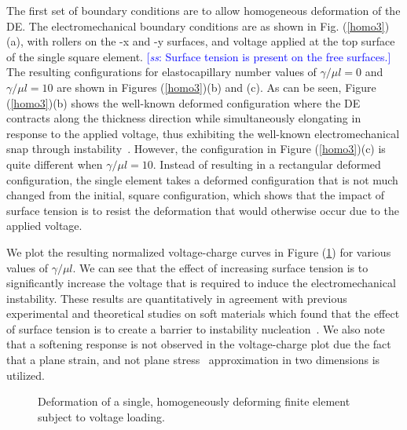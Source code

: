 \documentclass[final,authoryear,3p,times]{elsarticle}
\newcommand{\hsp}[1]{\textcolor{blue}{[\textit{ss}: #1]}}
\begin{document}
The first set of boundary conditions are to allow homogeneous deformation of the DE. The electromechanical boundary conditions are as shown in Fig. (\ref{homo3})(a), with rollers on the -x and -y surfaces, and voltage applied at the top surface of the single square element.  \hsp{Surface tension is present on the free surfaces.}  The resulting configurations for elastocapillary number values of $\gamma/\mu l=0$ and $\gamma/\mu l=10$ are shown in Figures (\ref{homo3})(b) and (c).  As can be seen, Figure (\ref{homo3})(b) shows the well-known deformed configuration where the DE contracts along the thickness direction while simultaneously elongating in response to the applied voltage, thus exhibiting the well-known electromechanical snap through instability~\cite{parkIJSS2012}.  However, the configuration in Figure (\ref{homo3})(c) is quite different when $\gamma/\mu l=10$.  Instead of resulting in a rectangular deformed configuration, the single element takes a deformed configuration that is not much changed from the initial, square configuration, which shows that the impact of surface tension is to resist the deformation that would otherwise occur due to the applied voltage.

We plot the resulting normalized voltage-charge curves in Figure (\ref{homo}) for various values of $\gamma/\mu l$.  We can see that the effect of increasing surface tension is to significantly increase the voltage that is required to induce the electromechanical instability.  These results are quantitatively in agreement with previous experimental and theoretical studies on soft materials which found that the effect of surface tension is to create a barrier to instability nucleation~\citep{chenPRL2012,moraSM2011}.  We also note that a softening response is not observed in the voltage-charge plot due the fact that a plane strain, and not plane stress~\citep{zhouIJSS2008} approximation in two dimensions is utilized. 

\begin{figure}
\centering
{}
	\caption{Deformation of a single, homogeneously deforming finite element subject to voltage loading.}
	\label{homo}
\end{figure}
\end{document}
